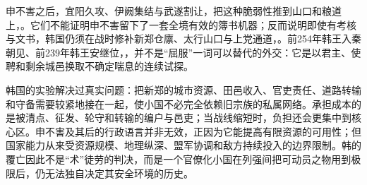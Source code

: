 申不害之后，宜阳久攻、伊阙集结与武遂割让，把这种脆弱性推到山口和粮道上，。它们不能证明申不害留下了一套全境有效的簿书机器；反而说明即使有考核与文书，韩国仍须在战时修补新郑仓廪、太行山口与上党通道，。前254年韩王入秦朝见、前239年韩王安继位，，并不是“屈服”一词可以替代的外交：它是以君主、使聘和剩余城邑换取不确定喘息的连续试探。

\begin{turningpoint}
韩国的实验解决过真实问题：把新郑的城市资源、田邑收入、官吏责任、道路转输和守备需要较紧地接在一起，使小国不必完全依赖旧宗族的私属网络。承担成本的是被清点、征发、轮守和转输的编户与邑吏；当战线缩短时，负担还会更集中到核心区。申不害及其后的行政语言并非无效，正因为它能提高有限资源的可用性；但国家能力从来受资源规模、地理纵深、盟军协调和敌方持续投入的边界限制。韩的覆亡因此不是“术”徒劳的判决，而是一个官僚化小国在列强间把可动员之物用到极限后，仍无法独自决定其安全环境的历史。
\end{turningpoint}
